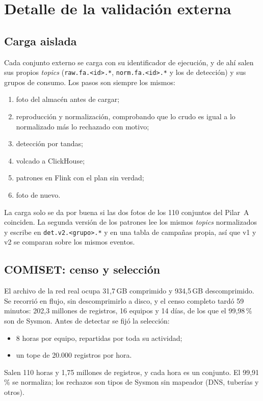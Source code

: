 \chapter{Detalle de la validación externa}
\label{anx:validacion}

\section{Carga aislada}

Cada conjunto externo se carga con su identificador de ejecución, y de ahí salen sus propios
\textit{topics} (\texttt{raw.fa.<id>.*}, \texttt{norm.fa.<id>.*} y los de detección) y sus grupos
de consumo. Los pasos son siempre los mismos:
\begin{enumerate}
    \item foto del almacén antes de cargar;
    \item reproducción y normalización, comprobando que lo crudo es igual a lo normalizado más lo
    rechazado con motivo;
    \item detección por tandas;
    \item volcado a ClickHouse;
    \item patrones en Flink con el plan sin verdad;
    \item foto de nuevo.
\end{enumerate}
La carga solo se da por buena si las dos fotos de los 110 conjuntos del Pilar~A coinciden. La
segunda versión de los patrones lee los mismos \textit{topics} normalizados y escribe en
\texttt{det.v2.<grupo>.*} y en una tabla de campañas propia, así que v1 y v2 se comparan sobre los
mismos eventos.

\section{COMISET: censo y selección}

El archivo de la red real ocupa 31,7\,GB comprimido y 934,5\,GB descomprimido. Se recorrió en
flujo, sin descomprimirlo a disco, y el censo completo tardó 59 minutos: 202,3 millones de registros,
16 equipos y 14 días, de los que el 99,98\,\% son de Sysmon. Antes de detectar se fijó la
selección:
\begin{itemize}
    \item 8 horas por equipo, repartidas por toda su actividad;
    \item un tope de 20.000 registros por hora.
\end{itemize}
Salen 110 horas y 1,75 millones de registros, y cada hora es un conjunto. El 99,91\,\% se normaliza;
los rechazos son tipos de Sysmon sin mapeador (DNS, tuberías y otros).

